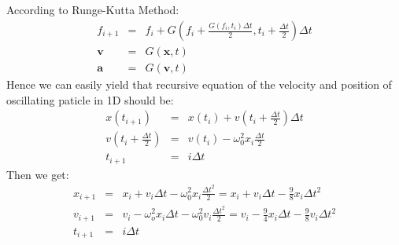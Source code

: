\documentclass{article}
\begin{document}
\subsection{}
According to Runge-Kutta Method:
\begin{eqnarray*}
	f_{i+1} & = & f_{i}+G(f_i+\frac{G(f_i,t_i)\Delta t}{2},t_i+\frac{\Delta t}{2}) \Delta t\\
\mathbf{v} & = & G(\mathbf{x},t)\\
\mathbf{a} & = & G(\mathbf{v},t)
\end{eqnarray*}
Hence we can easily yield that recursive equation of the velocity and position of oscillating paticle in 1D should be:\\
\begin{eqnarray*}
	x(t_{i+1})&=& x(t_i)+v(t_i+\frac{\Delta t}{2})\Delta t\\
	v(t_i+\frac{\Delta t}{2})&=& v(t_i)-\omega_0^2x_i\frac{\Delta t}{2}\\
	t_{i+1}&=& i\Delta t
\end{eqnarray*}
Then we get:
\begin{eqnarray*}
	x_{i+1}&=& x_{i}+v_{i}\Delta t-\omega_0^2x_i\frac{\Delta t^2}{2}=x_{i}+v_{i}\Delta t-\frac{9}{8}x_i\Delta t^2\\
	v_{i+1}&=& v_i-\omega_o^2x_i\Delta t-\omega_0^2v_i\frac{\Delta t^2}{2}=v_i-\frac{9}{4}x_i\Delta t-\frac{9}{8}v_i\Delta t^2\\
	t_{i+1}&=& i\Delta t
\end{eqnarray*}
\end{document}
